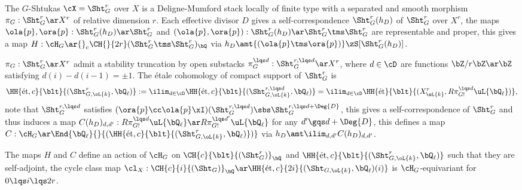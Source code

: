 \documentclass[a4paper, twoside]{article}
\begin{document}
\begin{stp}
	The $G$-Shtukas $\cX=\Sht_{G}^{r}$ over $X$ is a Deligne-Mumford stack locally of finite type with a separated and smooth morphism $\pi_{G}:\Sht_{G}^{r}\ar X^{r}$ of relative dimension $r$. Each effective divisor $D$ gives a self-correspondence $\Sht_{G}^{r}(h_{D})$ of $\Sht_{G}^{r}$ over $X^{r}$, the maps $\ola{p},\ora{p}:\Sht_{G}^{r}(h_{D})\ar\Sht_{G}^{r}$ and $(\ola{p},\ora{p}):\Sht_{G}^{r}(h_{D})\ar\Sht_{G}^{r}\tms\Sht_{G}^{r}$ are representable and proper, this gives a map $H:\cH_{G}\ar{}_{c}\CH{}{2r}(\Sht_{G}^{r}\tms\Sht_{G}^{r})_{\bQ}$ via $h_{D}\amt{(\ola{p}\tms\ora{p})}\zS[\Sht_{G}^{r}(h_{D})]$.

	$\pi_{G}:\Sht_{G}^{r}\ar X^{r}$ admit a stability truncation by open substacks $\pi_{G}^{\lqs d}:\Sht_{G}^{r,\lqs d}\ar X^{r}$, where $d\in\cD$ are functions $\bZ/r\bZ\ar\bZ$ satisfying $d(i)-d(i-1)=\pm1$. The {\'e}tale cohomology of compact support of $\Sht_{G}^{r}$ is
	\[
		\HH{\text{{\'e}t},c}{\blt}{(\Sht_{G,\oL{k}}^{r},\bQ_{\ell})}:=\ilim_{d\in\cD}\HH{\text{{\'e}t},c}{\blt}{(\Sht_{G,\oL{k}}^{r,\lqs d},\bQ_{\ell})}=\ilim_{d\in\cD}\HH{\text{{\'e}t}}{\blt}{(X_{\oL{k}}^{r},R\pi_{G!}^{\lqs d}\uL{\bQ_{\ell}})},
	\]
	note that $\Sht_{G}^{r,\lqs d}$ satisfies $(\ora{p}\cc\ola{p}\xI)(\Sht_{G}^{r,\lqs d})\sbs\Sht_{G}^{r,\lqs d+\Deg{D}}$, this gives a self-correspondence of $\Sht_{G}^{r}$ and thus induces a map $C(h_{D})_{d,d'}:R\pi_{G!}^{\lqs d}\uL{\bQ_{\ell}}\ar R\pi_{G!}^{\lqs d'}\uL{\bQ_{\ell}}$ for any $d'\gqs d+\Deg{D}$, this defines a map $C:\cH_{G}\ar\End{\bQ_{\ell}}{}{(\HH{\text{{\'e}t},c}{\blt}{(\Sht_{G,\oL{k}}^{r},\bQ_{\ell})})}$ via $h_{D}\amt \ilim_{d,d'}C(h_{D})_{d,d'}$.
\end{stp}

\begin{thm}
	The maps $H$ and $C$ define an action of $\cH_{G}$ on $\CH{c}{\blt}{(\Sht_{G}^{r})}_{\bQ}$ and $\HH{\text{{\'e}t},c}{\blt}{(\Sht_{G,\oL{k}}^{r},\bQ_{\ell})}$ such that they are self-adjoint, the cycle class map $\cl_{X}:\CH{c}{i}{(\Sht_{G})}_{\bQ}\ar\HH{\text{{\'e}t},c}{2i}{(\Sht_{G,\oL{k}},\bQ_{\ell})(i)}$ is $\cH_{G}$-equivariant for $0\lqs i\lqs 2r$.
\end{thm}

\end{document}
